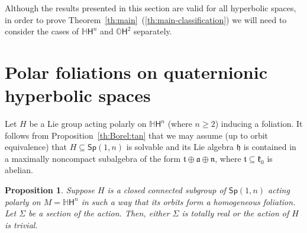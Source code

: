 \documentclass[12pt, a4paper]{amsart}
\newcommand{\g}{\mathfrak}
\newcommand{\s}{\mathsf}
\renewcommand{\H}{\mathbb{H}}
\renewcommand{\O}{\mathbb{O}}
\newtheorem{proposition}[theorem]{Proposition}
\theoremstyle{definition}
\begin{document}
Although the results presented in this section are valid for all hyperbolic spaces,
in order to prove Theorem~\ref{th:main}~(\ref{th:main-classification}) we will need to consider the cases of $\H\s{H}^n$
and $\O\s{H}^2$ separately.

\section{Polar foliations on quaternionic hyperbolic spaces}\label{sec:quaternionic}

Let $H$ be a Lie group acting polarly on $\H\s{H}^n$ (where $n\geq 2$) inducing a foliation.
It follows from Proposition~\ref{th:Borel:tan} that we may assume (up to orbit equivalence) that $H\subseteq \s{Sp}(1,n)$ is solvable and its Lie algebra $\g{h}$ is contained in a maximally noncompact subalgebra of the form $\g{t}\oplus\g{a}\oplus\g{n}$, where $\g{t}\subseteq \g{k}_0$ is abelian.

\begin{proposition}\label{prop:section-constant-curvature}
Suppose $H$ is a closed connected subgroup of $\s{Sp}(1,n)$ acting polarly on $M=\H\s{H}^n$ in such a way that its orbits form a homogeneous foliation.
Let $\Sigma$ be a section of the action.
Then, either $\Sigma$ is totally real or the action of $H$ is trivial.
\end{proposition}
\end{document}
